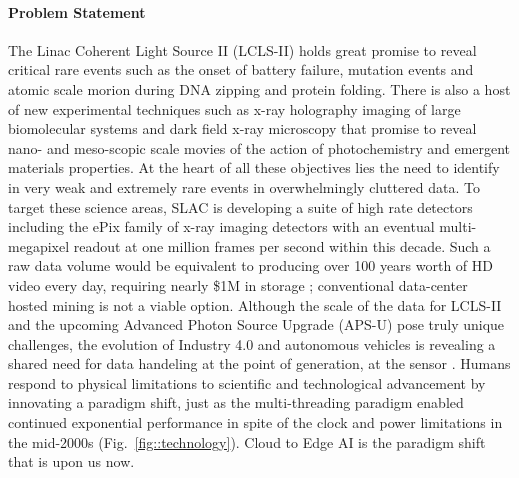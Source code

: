 \documentclass{article}
\begin{document}
\paragraph{Problem Statement}%
The Linac Coherent Light Source II (LCLS-II) holds great promise to reveal critical rare events such as the onset of battery failure, mutation events and atomic scale morion during DNA zipping and protein folding.
There is also a host of new experimental techniques such as x-ray holography imaging of large biomolecular systems and dark field x-ray microscopy that promise to reveal nano- and meso-scopic scale movies of the action of photochemistry and emergent materials properties.
At the heart of all these objectives lies the need to identify in very weak and extremely rare events in overwhelmingly cluttered data. 
To target these science areas, SLAC is developing a suite of high rate detectors including the ePix family of x-ray imaging detectors with an eventual multi-megapixel readout at one million frames per second within this decade.
Such a raw data volume would be equivalent to producing over 100 years worth of HD video \cite{HowBigVideo} every day, requiring nearly \$1M in storage \cite{CostPerTB}; conventional data-center hosted mining is not a viable option.
Although the scale of the data for LCLS-II and the upcoming Advanced Photon Source Upgrade (APS-U) pose truly unique challenges, the evolution of Industry 4.0 and autonomous vehicles is revealing a shared need for data handeling at the point of generation, at the sensor \cite{Gartner2018,NetworkWorld2019}.
Humans respond to physical limitations to scientific and technological advancement by innovating a paradigm shift, just as the multi-threading paradigm enabled continued exponential performance in spite of the clock and power limitations in the mid-2000s (Fig.~\ref{fig::technology}).
Cloud to Edge AI is the paradigm shift that is upon us now.
\end{document}
